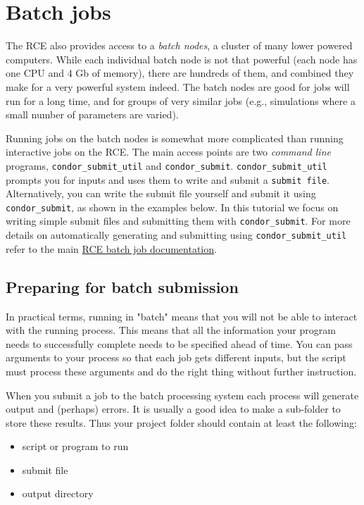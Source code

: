 \documentclass[11pt]{article}
\begin{document}
\section{Batch jobs}
\label{sec-7}
The RCE also provides access to a \emph{batch nodes}, a cluster of many lower powered computers. While each individual batch node is not that powerful (each node has one CPU and 4 Gb of memory), there are hundreds of them, and combined they make for a very powerful system indeed. The batch nodes are good for jobs will run for a long time, and for groups of very similar jobs (e.g., simulations where a small number of parameters are varied).

Running jobs on the batch nodes is somewhat more complicated than running interactive jobs on the RCE. The main access points are two \emph{command line} programs, \texttt{condor\_submit\_util} and \texttt{condor\_submit}. \texttt{condor\_submit\_util} prompts you for inputs and uses them to write and submit a \texttt{submit file}. Alternatively, you can write the submit file yourself and submit it using \texttt{condor\_submit}, as shown in the examples below. In this tutorial we focus on writing simple submit files and submitting them with \texttt{condor\_submit}. For more details on automatically generating and submitting using \texttt{condor\_submit\_util} refer to the main \href{http://projects.iq.harvard.edu/rce/book/batch-processing-basics}{RCE batch job documentation}. 

\subsection{Preparing for batch submission}
\label{sec-7-1}

In practical terms, running in "batch" means that you will not be able to interact with the running process. This means that all the information your program needs to successfully complete needs to be specified ahead of time. You can pass arguments to your process so that each job gets different inputs, but the script must process these arguments and do the right thing without further instruction.

When you submit a job to the batch processing system each process will generate output and (perhaps) errors. It is usually a good idea to make a sub-folder to store these results. Thus your project folder should contain at least the following:
\begin{itemize}
\item script or program to run
\item submit file
\item output directory
\end{itemize}
\end{document}
